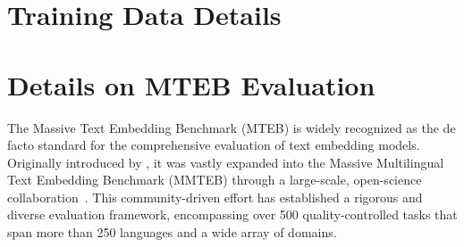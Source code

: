 
\clearpage
\section{Training Data Details}\label{appendix:data}




\clearpage
\section{Details on MTEB Evaluation}\label{appendix:mteb}



The Massive Text Embedding Benchmark (MTEB) is widely recognized as the de facto standard for the comprehensive evaluation of text embedding models. Originally introduced by \citet{2023MTEB}, it was vastly expanded into the Massive Multilingual Text Embedding Benchmark (MMTEB) through a large-scale, open-science collaboration~\citep{2025MMTEB}. This community-driven effort has established a rigorous and diverse evaluation framework, encompassing over 500 quality-controlled tasks that span more than 250 languages and a wide array of domains.


